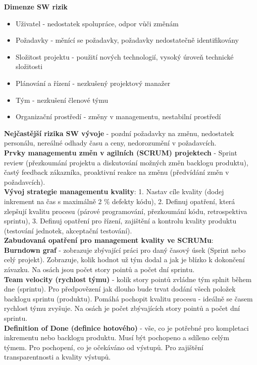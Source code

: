 \documentclass[11pt,a4paper]{article}
\begin{document}
        \textbf{Dimenze SW rizik}
        \begin{itemize}
            \item Uživatel - nedostatek spolupráce, odpor vůči změnám
            \item Požadavky - měnící se požadavky, požadavky nedostatečně identifikovány
            \item Složitost projektu - použití nových technologií, vysoký úroveň technické složitosti
            \item Plánování a řízení - nezkušený projektový manažer
            \item Tým - nezkušení členové týmu
            \item Organizační prostředí - změny v managementu, nestabilní prostředí
        \end{itemize}
        \textbf{Nejčastější rizika SW vývoje} - pozdní požadavky na změnu, nedostatek personálu, nereálné odhady času a ceny, nedorozumění v požadavcích.\\
        \textbf{Prvky managementu změn v agilních (SCRUM) projektech} - Sprint review (přezkoumání projektu a diskutování možných změn backlogu produktu), častý feedback zákazníka, proaktivní reakce na změnu (předvídání změn v požadavcích).\\
        \textbf{Vývoj strategie managementu kvality}: 1. Nastav cíle kvality (dodej inkrement na čas s maximálně 2 \% defekty kódu), 2. Definuj opatření, která zlepšují kvalitu procesu (párové programování, přezkoumání kódu, retrospektiva sprintu), 3. Definuj opatření pro řízení, zajištění a kontrolu kvality produktu (testování jednotek, akceptační testování).\\
        \textbf{Zabudovaná opatření pro management kvality ve SCRUMu}:\\
        \textbf{Burndown graf} - zobrazuje zbývající práci pro daný časový úsek (Sprint nebo celý projekt). Zobrazuje, kolik hodnot už tým dodal a jak je blízko k dokončení závazku. Na osách jsou počet story pointů a počet dní sprintu.\\
        \textbf{Team velocity (rychlost týmu)} - kolik story pointů zvládne tým splnit během dne (sprintu). Pro předpovězení jak dlouho bude trvat dodání všech položek backlogu sprintu (produktu). Pomáhá pochopit kvalitu procesu - ideálně se časem rychlost týmu zvyšuje. Na osách je počet zbývajících story pointů a počet dní sprintu.\\
        \textbf{Definition of Done (definice hotového)} - vše, co je potřebné pro kompletaci inkrementu nebo backlogu produktu. Musí být pochopeno a sdíleno celým týmem. Pro pochopení, co je očekáváno od výstupů. Pro zajištění transparentnosti a kvality výstupů.\\
\end{document}
